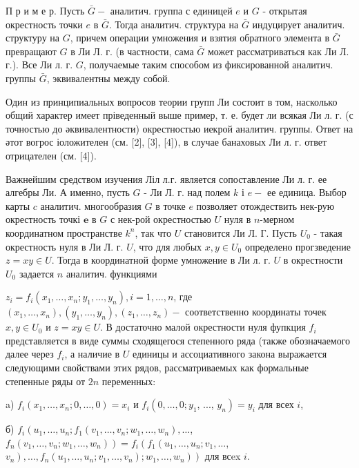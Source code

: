 \documentclass[10pt]{article}
\begin{document}
П р и м е р. Пусть $\bar{G}-$ аналитич. группа с единицей $e$ и $G$ - открытая окрестность точки $e$ в $\bar{G}$. Тогда аналитич. структура на $\bar{G}$ индуцирует аналитич. структуру на $G$, причем операции умножения и взятия обратного элемента в $\bar{G}$ превращают $G$ в Ли Л. г. (в частности, сама $\bar{G}$ может рассматриваться как Ли Л. г.). Все Ли л. г. $G$, получаемые таким способом из фиксированной аналитич. группы $\bar{G}$, эквивалентны между собой.



Один из принципиальных вопросов теории групп Ли состоит в том, насколько общий характер имеет пріведенный выше пример, т. е. будет ли всякая Ли л. г. (с точностью до әквивалентности) окрестностью иекрой аналитич. группы. Ответ на әтот вогрос іоложителен (см. [2], [3], [4]), в случае банаховых Ли л. г. ответ отрицателен (см. [4]).



Важнейшим средством изучения Ліл л.г. является сопоставление Ли л. г. ее алгебры Ли. А именно, пусть $G$ - Ли Л. г. над полем $k$ і $e-$ ее единица. Выбор карты $c$ аналитич. многообразия $G$ в точке $e$ позволяет отождествить нек-рую окрестность точкі $\boldsymbol{e}$ в $G$ с нек-рой окрестностью $U$ нуля в $n$-мерном координатном пространстве $k^{n}$, так что $U$ становится Ли Л. Г. Пусть $U_{0}$ - такая окрестность нуля в Ли Л. г. $U$, что для любых $x, y \in U_{0}$ определено прогзведение $z=x y \in U$. Тогда в координатной форме умножение в Ли л. г. $U$ в окрестности $U_{0}$ задается $n$ аналитич. функциями



$z_{i}=f_{i}\left(x_{1}, \ldots, x_{n} ; y_{1}, \ldots, y_{n}\right), i=1, \ldots, n$, где $\left(x_{1}, \ldots, x_{n}\right),\left(y_{1}, \ldots, y_{n}\right),\left(z_{1}, \ldots, z_{n}\right)-$ соответственно координаты точек $x, y \in U_{0}$ и $z=x y \in U$. В достаточно малой окрестности нуля фупкция $f_{i}$ представляется в виде суммы сходящегося степенного ряда (также обозначаемого далее через $f_{i}$, а наличие в $U$ единицы и ассоциативного закона выражается следующими свойствами этих рядов, рассматриваемых как формальные степенные ряды от $2 n$ переменных:



a) $f_{i}\left(x_{1}, \ldots, x_{n} ; 0, \ldots, 0\right)=x_{i}$ и $f_{i}\left(0, \ldots, 0 ; y_{1}\right.$, ..., $\left.y_{n}\right)=y_{i}$ для всех $i$,



б) $f_{i}\left(u_{1}, \ldots, u_{n} ; f_{1}\left(v_{1}, \ldots, v_{n} ; w_{1}, \ldots, w_{n}\right), \ldots\right.$, $\left.f_{n}\left(v_{1}, \ldots, v_{n} ; w_{1}, \ldots, w_{n}\right)\right)=f_{i}\left(f_{1}\left(u_{1}, \ldots, u_{n} ; v_{1}, \ldots\right.\right.$, $\left.\left.\left.v_{n}\right), \ldots, f_{n}\left(u_{1}, \ldots, u_{n} ; v_{1}, \ldots, v_{n}\right) ; w_{1}, \ldots, w_{n}\right)\right)$ для всex $i$.
\end{document}
